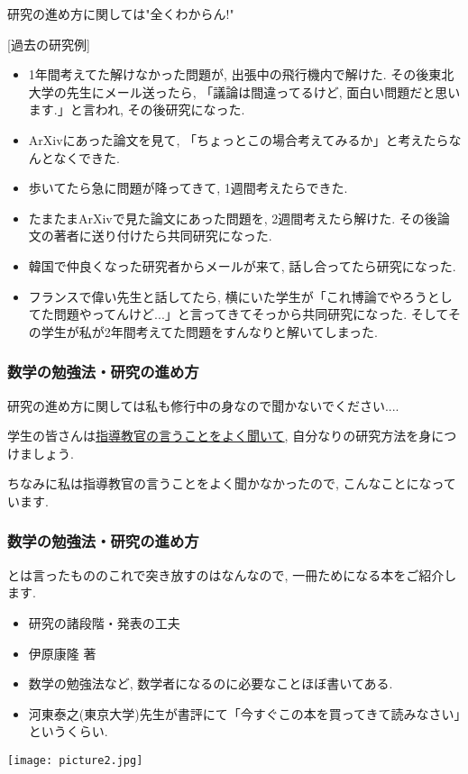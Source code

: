 \documentclass[11pt,dvipdfmx]{beamer}
\theoremstyle{definition}
\theoremstyle{remark}
\begin{document}
\begin{frame} 
研究の進め方に関しては"全くわからん!"

[過去の研究例]
\begin{itemize}
\item 1年間考えてた解けなかった問題が, 出張中の飛行機内で解けた. その後東北大学の先生にメール送ったら, 「議論は間違ってるけど, 面白い問題だと思います.」と言われ, その後研究になった.
\item ArXivにあった論文を見て, 「ちょっとこの場合考えてみるか」と考えたらなんとなくできた. 
\item 歩いてたら急に問題が降ってきて, 1週間考えたらできた. 
\item たまたまArXivで見た論文にあった問題を, 2週間考えたら解けた. その後論文の著者に送り付けたら共同研究になった. 
\item 韓国で仲良くなった研究者からメールが来て, 話し合ってたら研究になった.
\item フランスで偉い先生と話してたら, 横にいた学生が「これ博論でやろうとしてた問題やってんけど...」と言ってきてそっから共同研究になった. そしてその学生が私が2年間考えてた問題をすんなりと解いてしまった. 
\end{itemize}
\end{frame}



\begin{frame} 
 \frametitle{数学の勉強法・研究の進め方}
研究の進め方に関しては私も修行中の身なので聞かないでください....

\begin{block}{}
学生の皆さんは\underline{指導教官の言うことをよく聞いて}, 自分なりの研究方法を身につけましょう.
  \end{block}
  
  {\scriptsize ちなみに私は指導教官の言うことをよく聞かなかったので, こんなことになっています. }
  
\end{frame}


\begin{frame} 
 \frametitle{数学の勉強法・研究の進め方}
 
とは言ったもののこれで突き放すのはなんなので, 一冊ためになる本をご紹介します.

   \begin{multicols}{2}
     
        \begin{itemize}
	    \item 研究の諸段階・発表の工夫 
	     \item 伊原康隆 著
	     \item 数学の勉強法など, 数学者になるのに必要なことほぼ書いてある. 
	    \item 河東泰之(東京大学)先生が書評にて「今すぐこの本を買ってきて読みなさい」というくらい.
	\end{itemize}
     \texttt{[image: picture2.jpg]}
   \end{multicols}
    
\end{frame}
\end{document}

